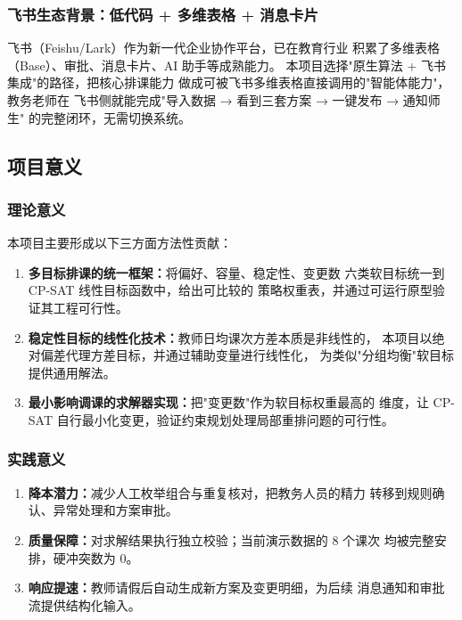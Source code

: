 \subsubsection{飞书生态背景：低代码 + 多维表格 + 消息卡片}

飞书（Feishu/Lark）作为新一代企业协作平台，已在教育行业
积累了多维表格（Base）、审批、消息卡片、AI 助手等成熟能力。
本项目选择"原生算法 + 飞书集成"的路径，把核心排课能力
做成可被飞书多维表格直接调用的"智能体能力"，教务老师在
飞书侧就能完成"导入数据 → 看到三套方案 → 一键发布 → 通知师生"
的完整闭环，无需切换系统。

\subsection{项目意义}

\subsubsection{理论意义}

本项目主要形成以下三方面方法性贡献：
\begin{enumerate}[leftmargin=2em,itemsep=0.2em]
\item \textbf{多目标排课的统一框架：}将偏好、容量、稳定性、变更数
六类软目标统一到 CP-SAT 线性目标函数中，给出可比较的
策略权重表，并通过可运行原型验证其工程可行性。
\item \textbf{稳定性目标的线性化技术：}教师日均课次方差本质是非线性的，
本项目以绝对偏差代理方差目标，并通过辅助变量进行线性化，
为类似"分组均衡"软目标提供通用解法。
\item \textbf{最小影响调课的求解器实现：}把"变更数"作为软目标权重最高的
维度，让 CP-SAT 自行最小化变更，验证约束规划处理局部重排问题的可行性。
\end{enumerate}

\subsubsection{实践意义}

\begin{enumerate}[leftmargin=2em,itemsep=0.2em]
\item \textbf{降本潜力：}减少人工枚举组合与重复核对，把教务人员的精力
转移到规则确认、异常处理和方案审批。
\item \textbf{质量保障：}对求解结果执行独立校验；当前演示数据的 8 个课次
均被完整安排，硬冲突数为 0。
\item \textbf{响应提速：}教师请假后自动生成新方案及变更明细，为后续
消息通知和审批流提供结构化输入。
\end{enumerate}

